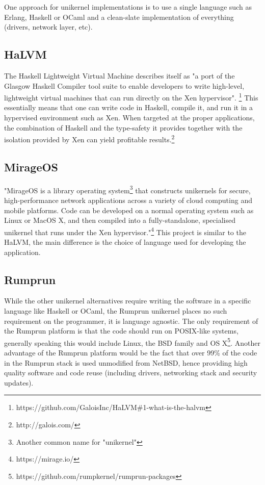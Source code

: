 \documentclass[10pt,a4paper,twoside]{article}
\begin{document}
One approach for unikernel implementations is to use a single language such as Erlang, Haskell or OCaml and a clean-slate implementation of everything (drivers, network layer, etc).\cite{RumpComparison}

\subsection{HaLVM}

The Haskell Lightweight Virtual Machine describes itself as
"a port of the Glasgow Haskell Compiler tool suite to enable developers to write high-level,
lightweight virtual machines that can run directly on the Xen hypervisor".
\footnote{https://github.com/GaloisInc/HaLVM\#1-what-is-the-halvm}
This essentially means that one can write code in Haskell, compile it, and run it in a hypervised environment
such as Xen. When targeted at the proper applications, the combination of Haskell and the type-safety it provides
together with the isolation provided by Xen can yield profitable results.\footnote{http://galois.com/}

\subsection{MirageOS}
"MirageOS is a library operating system\footnote{Another common name for "unikernel"} that constructs unikernels for secure, high-performance network applications across a variety of cloud computing and mobile platforms. Code can be developed on a normal operating system such as Linux or MacOS X, and then compiled into a fully-standalone, specialised unikernel that runs under the Xen hypervisor."\footnote{https://mirage.io/} This project is similar to the HaLVM, the main difference is the choice of language used for developing the application.

\subsection{Rumprun}
While the other unikernel alternatives require writing the software in a specific language like Haskell or OCaml, the Rumprun unikernel places no such requirement on the programmer, it is language agnostic. The only requirement of the Rumprun platform is that the code should run on POSIX-like systems, generally speaking this would include Linux, the BSD family and OS X\footnote{https://github.com/rumpkernel/rumprun-packages}. Another advantage of the Rumprun platform would be the fact that over 99\% of the code in the Rumprun stack is used unmodified from NetBSD, hence providing high quality software and code reuse (including drivers, networking stack and security updates).\cite{RumpComparison}
\end{document}
